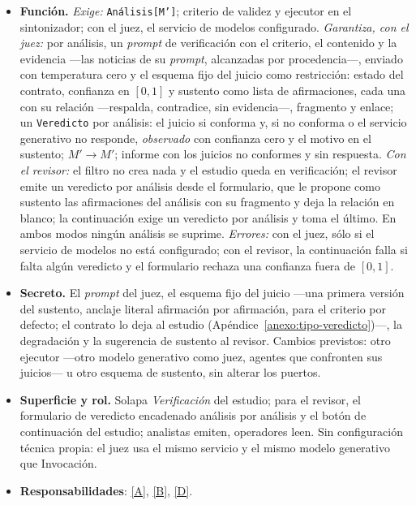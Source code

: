 \documentclass[12pt]{report}
\DeclareRobustCommand{\resp}[1]{\hyperref[tab:registro-responsabilidades]{\textcolor{respcolor}{[#1]}}}
\begin{document}
\begin{itemize}
  \item \textbf{Función.} \textit{Exige:} \texttt{Análisis[M']}; criterio de validez y ejecutor en el sintonizador; con el juez, el servicio de modelos configurado. \textit{Garantiza, con el juez:} por análisis, un \textit{prompt} de verificación con el criterio, el contenido y la evidencia ---las noticias de su \textit{prompt}, alcanzadas por procedencia---, enviado con temperatura cero y el esquema fijo del juicio como restricción: estado del contrato, confianza en \([0, 1]\) y sustento como lista de afirmaciones, cada una con su relación ---respalda, contradice, sin evidencia---, fragmento y enlace; un \texttt{Veredicto} por análisis: el juicio si conforma y, si no conforma o el servicio generativo no responde, \textit{observado} con confianza cero y el motivo en el sustento; \(M' \to M'\); informe con los juicios no conformes y sin respuesta. \textit{Con el revisor:} el filtro no crea nada y el estudio queda en verificación; el revisor emite un veredicto por análisis desde el formulario, que le propone como sustento las afirmaciones del análisis con su fragmento y deja la relación en blanco; la continuación exige un veredicto por análisis y toma el último. En ambos modos ningún análisis se suprime. \textit{Errores:} con el juez, sólo si el servicio de modelos no está configurado; con el revisor, la continuación falla si falta algún veredicto y el formulario rechaza una confianza fuera de \([0, 1]\).
  \item \textbf{Secreto.} El \textit{prompt} del juez, el esquema fijo del juicio ---una primera versión del sustento, anclaje literal afirmación por afirmación, para el criterio por defecto; el contrato lo deja al estudio (Apéndice~\ref{anexo:tipo-veredicto})---, la degradación y la sugerencia de sustento al revisor. Cambios previstos: otro ejecutor ---otro modelo generativo como juez, agentes que confronten sus juicios--- u otro esquema de sustento, sin alterar los puertos.
  \item \textbf{Superficie y rol.} Solapa \textit{Verificación} del estudio; para el revisor, el formulario de veredicto encadenado análisis por análisis y el botón de continuación del estudio; analistas emiten, operadores leen. Sin configuración técnica propia: el juez usa el mismo servicio y el mismo modelo generativo que Invocación.
  \item \textbf{Responsabilidades}: \resp{A}, \resp{B}, \resp{D}.
\end{itemize}
\end{document}
